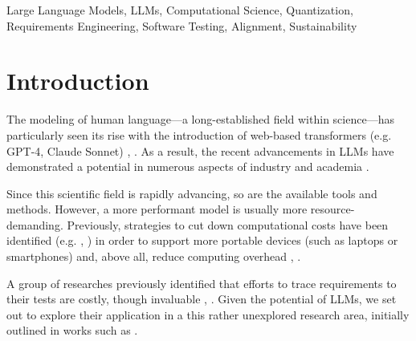 \documentclass[conference]{IEEEtran}
\begin{document}
\begin{IEEEkeywords}
Large Language Models, LLMs, Computational Science, Quantization, Requirements
Engineering, Software Testing, Alignment, Sustainability
\end{IEEEkeywords}

\section{Introduction}\label{intro}


The modeling of human language---a long-established field within science---has
particularly seen its rise with the introduction of web-based transformers
(e.g. GPT-4, Claude Sonnet) \cite{jonesNaturalLanguageProcessing1994},
\cite{vaswaniAttentionAllYou2017}. As a result, the recent advancements in LLMs
have demonstrated a potential in numerous aspects of industry and academia \cite{naveedComprehensiveOverviewLarge2024}.

Since this scientific field is rapidly advancing, so are the available tools and methods. However, a more performant model is usually more resource-demanding.
Previously, strategies to cut down computational costs have been identified (e.g.
\cite{linAWQActivationawareWeight2024},
\cite{chenEfficientQATEfficientQuantizationAware2024}) in order to support more
portable devices (such as laptops or smartphones) and, above all, reduce computing overhead \cite{zhuSurveyModelCompression2024}, \cite{rasleyDeepSpeedSystemOptimizations2020}.

A group of researches previously identified that efforts to trace requirements
to their tests are costly, though invaluable \cite{barmi_alignment_2011}, \cite{AutomatedAlignmentSoftware}.
Given the potential of LLMs, we set out to explore their application in
a this rather unexplored research area, initially outlined in works such as
\cite{ivarsson2023automated}.
\end{document}
